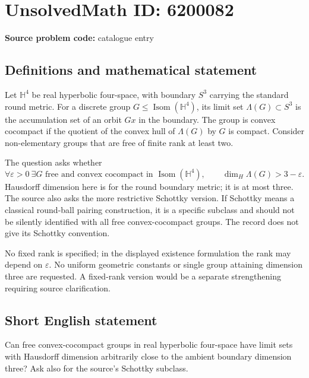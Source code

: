 \documentclass[11pt]{article}
\begin{document}
\section*{UnsolvedMath ID: 6200082}
\textbf{Source problem code:} catalogue entry
\subsection{Definitions and mathematical statement}
Let $\mathbb H^4$ be real hyperbolic four-space, with boundary $S^3$ carrying the standard round metric. For a discrete group $G\leq\operatorname{Isom}(\mathbb H^4)$, its limit set $\Lambda(G)\subset S^3$ is the accumulation set of an orbit $Gx$ in the boundary. The group is convex cocompact if the quotient of the convex hull of $\Lambda(G)$ by $G$ is compact. Consider non-elementary groups that are free of finite rank at least two.

The question asks whether
\[
\forall\varepsilon>0\ \exists G\text{ free and convex cocompact in }\operatorname{Isom}(\mathbb H^4),
\qquad \dim_H\Lambda(G)>3-\varepsilon.
\]
Hausdorff dimension here is for the round boundary metric; it is at most three. The source also asks the more restrictive Schottky version. If Schottky means a classical round-ball pairing construction, it is a specific subclass and should not be silently identified with all free convex-cocompact groups. The record does not give its Schottky convention.

No fixed rank is specified; in the displayed existence formulation the rank may depend on $\varepsilon$. No uniform geometric constants or single group attaining dimension three are requested. A fixed-rank version would be a separate strengthening requiring source clarification.
\subsection{Short English statement}
Can free convex-cocompact groups in real hyperbolic four-space have limit sets with Hausdorff dimension arbitrarily close to the ambient boundary dimension three? Ask also for the source's Schottky subclass.
\end{document}
